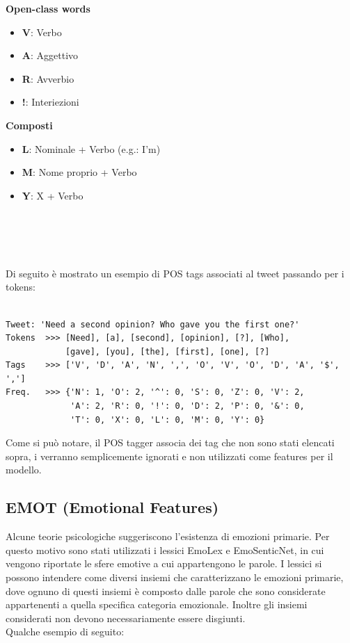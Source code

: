 \documentclass[oneside]{book}
\begin{document}
\begin{varwidth}[t]{\textwidth}
	\textbf{Open-class words}
	\begin{itemize}
		\item \textbf{V}: Verbo
		\item \textbf{A}: Aggettivo
		\item \textbf{R}: Avverbio
		\item \textbf{!}: Interiezioni
	\end{itemize}
\end{varwidth}
\hspace{11em}
\begin{varwidth}[t]{\textwidth}
	\textbf{Composti}
	\begin{itemize}
		\item \textbf{L}: Nominale + Verbo (e.g.: I'm)
		\item \textbf{M}: Nome proprio + Verbo
		\item \textbf{Y}: X + Verbo
	\end{itemize}
\end{varwidth}\\\\\\\\
Di seguito è mostrato un esempio di POS tags associati al tweet passando per i tokens:


\begin{lstlisting}[caption={Esempio di tweet con POS tag associte.}]

Tweet: 'Need a second opinion? Who gave you the first one?'
Tokens  >>> [Need], [a], [second], [opinion], [?], [Who],
            [gave], [you], [the], [first], [one], [?]
Tags    >>> ['V', 'D', 'A', 'N', ',', 'O', 'V', 'O', 'D', 'A', '$', ',']
Freq.   >>> {'N': 1, 'O': 2, '^': 0, 'S': 0, 'Z': 0, 'V': 2,
             'A': 2, 'R': 0, '!': 0, 'D': 2, 'P': 0, '&': 0,
             'T': 0, 'X': 0, 'L': 0, 'M': 0, 'Y': 0}
\end{lstlisting}
Come si può notare, il POS tagger associa dei tag che non sono stati elencati sopra, i verranno semplicemente ignorati e non utilizzati come features per il modello. 

\subsection{EMOT (Emotional Features)}
Alcune teorie psicologiche suggeriscono l'esistenza di emozioni primarie. Per questo motivo sono stati utilizzati i lessici EmoLex e EmoSenticNet, in cui vengono riportate le sfere emotive a cui appartengono le parole.
I lessici si possono intendere come diversi insiemi che caratterizzano le emozioni primarie, dove ognuno di questi insiemi è composto dalle parole che sono considerate appartenenti a quella specifica categoria emozionale. Inoltre gli insiemi considerati non devono necessariamente essere disgiunti.\\
Qualche esempio di seguito:
\end{document}
